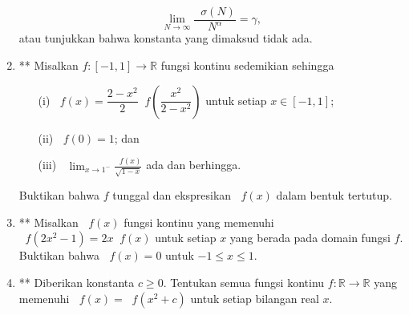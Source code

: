\documentclass[12pt]{article}
\newcommand*\func[2]{\mathop{}\!{#1}{\left({#2}\right)}}
\newcommand*\ds[1]{\mathop{}\!\displaystyle{{#1}}}
\begin{document}
\begin{enumerate}[leftmargin=*]
		\[ \lim_{N \to \infty}{\frac{\func{\sigma}{N}}{N^{\alpha}}} = \gamma, \]
		atau tunjukkan bahwa konstanta yang dimaksud tidak ada.
		\item** Misalkan $ f : \left[-1, 1\right] \to \mathbb{R} $ fungsi kontinu sedemikian sehingga
		\begin{enumerate}
			\item[(i)] $ \func{f}{x} = \dfrac{2 - x^{2}}{2}\func{f}{\dfrac{x^{2}}{2 - x^{2}}} $ untuk setiap $ x \in \left[-1, 1\right] $;
			\item[(ii)] $ \func{f}{0} = 1 $; dan
			\item[(iii)] $ \ds{\lim_{x \to 1^{-}}{\frac{\func{f}{x}}{\sqrt{1 - x}}}} $ ada dan berhingga.
		\end{enumerate}
		Buktikan bahwa $ f $ tunggal dan ekspresikan $ \func{f}{x} $ dalam bentuk tertutup.
		\item** Misalkan $ \func{f}{x} $ fungsi kontinu yang memenuhi $ \func{f}{2x^{2} - 1} = 2x\func{f}{x} $ untuk setiap $ x $ yang berada pada domain fungsi $ f $. Buktikan bahwa $ \func{f}{x} = 0 $ untuk $ -1 \leq x \leq 1 $.
		\item** Diberikan konstanta $ c \geq 0 $. Tentukan semua fungsi kontinu $ f : \mathbb{R} \to \mathbb{R} $ yang memenuhi $ \func{f}{x} = \func{f}{x^{2} + c} $ untuk setiap bilangan real $ x $.
	\end{enumerate}
	
	\newpage
	
\end{document}
